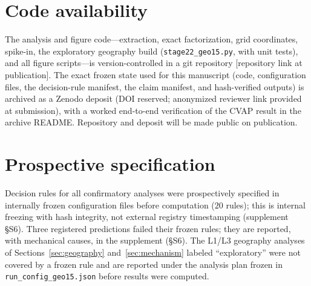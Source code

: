 \documentclass[12pt]{article}
\begin{document}
\section*{Code availability}
The analysis and figure code---extraction, exact factorization, grid
coordinates, spike-in, the exploratory geography build
(\texttt{stage22\_geo15.py}, with unit tests), and all figure scripts---is
version-controlled in a git repository [repository link at publication]. The
exact frozen state used for this manuscript (code, configuration files, the
decision-rule manifest, the claim manifest, and hash-verified outputs) is
archived as a Zenodo deposit (DOI reserved; anonymized reviewer link provided
at submission), with a worked end-to-end verification of the CVAP result in
the archive README. Repository and deposit will be made public on
publication.

\section*{Prospective specification}
Decision rules for all confirmatory analyses were prospectively specified in
internally frozen configuration files before computation ($20$ rules); this
is internal freezing with hash integrity, not external registry
timestamping (supplement \S S6). Three registered predictions failed
their frozen rules; they are reported, with mechanical causes, in the
supplement (\S S6). The L1/L3 geography analyses of
Sections~\ref{sec:geography} and~\ref{sec:mechanism} labeled ``exploratory''
were not covered by a frozen rule and are reported under the analysis plan
frozen in \texttt{run\_config\_geo15.json} before results were computed.



\end{document}
